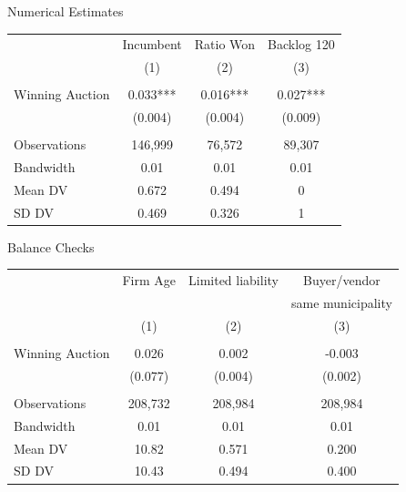 \documentclass{beamer}
\begin{document}

\begin{frame}{Numerical Estimates}
\begin{center}
\begin{tabular}{lccc}
\hline\hline
 & Incumbent & Ratio Won & Backlog 120 \\
 & (1) & (2) & (3) \\
\hline
\\[-4pt]
Winning Auction & 0.033*** & 0.016*** & 0.027*** \\
 & (0.004) & (0.004) & (0.009) \\
\\[-4pt]
Observations & 146{,}999 & 76{,}572 & 89{,}307 \\
Bandwidth & 0.01 & 0.01 & 0.01 \\
Mean DV & 0.672 & 0.494 & 0 \\
SD DV   & 0.469 & 0.326 & 1 \\
\hline\hline
\end{tabular}
\end{center}
\end{frame}


\begin{frame}{Balance Checks}
\begin{center}
\begin{tabular}{lccc}
\hline\hline
 & Firm Age & Limited liability & Buyer/vendor \\
 &          &                   & same municipality \\
 & (1) & (2) & (3) \\
\hline
\\[-4pt]
Winning Auction   & 0.026 & 0.002 & -0.003 \\
                  & (0.077) & (0.004) & (0.002) \\
\\[-4pt]
Observations & 208{,}732 & 208{,}984 & 208{,}984 \\
Bandwidth    & 0.01 & 0.01 & 0.01 \\
Mean DV      & 10.82 & 0.571 & 0.200 \\
SD DV        & 10.43 & 0.494 & 0.400 \\
\hline\hline
\end{tabular}
\end{center}
\end{frame}
\end{document}
